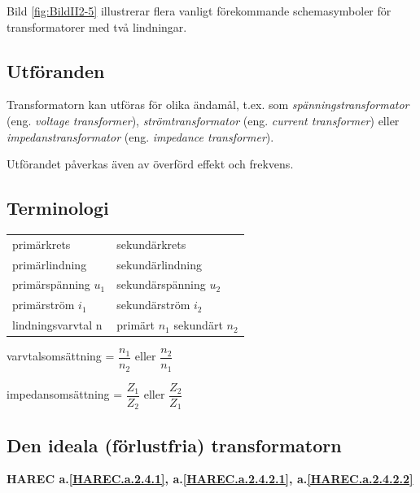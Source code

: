 Bild \ref{fig:BildII2-5} illustrerar flera vanligt förekommande schemasymboler
för transformatorer med två lindningar.

\subsection{Utföranden}

Transformatorn kan utföras för olika ändamål, t.ex. som
\emph{spänningstransformator} (eng. \emph{voltage transformer}),
\emph{strömtransformator} (eng. \emph{current transformer}) eller
\emph{impedanstransformator} (eng. \emph{impedance transformer}).

Utförandet påverkas även av överförd effekt och frekvens.

\subsection{Terminologi}

\begin{tabular}{ll}
primärkrets & sekundärkrets \\
primärlindning & sekundärlindning \\
primärspänning \(u_1\) &  sekundärspänning \(u_2\) \\
primärström \(i_1\) & sekundärström \(i_2\) \\
lindningsvarvtal n & primärt \(n_1\) sekundärt \(n_2\)
\end{tabular}

varvtalsomsättning = \(\dfrac{n_1}{n_2}\) eller \(\dfrac{n_2}{n_1}\)

impedansomsättning = \(\dfrac{Z_1}{Z_2}\) eller \(\dfrac{Z_2}{Z_1}\)

\subsection{Den ideala (förlustfria) transformatorn}
\textbf{HAREC a.\ref{HAREC.a.2.4.1}, a.\ref{HAREC.a.2.4.2.1},
a.\ref{HAREC.a.2.4.2.2}\label{myHAREC.a.2.4.1}
\label{myHAREC.a.2.4.2.1}\label{myHAREC.a.2.4.2.2}}

